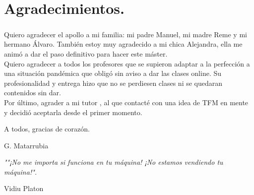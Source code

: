 \chapter{Agradecimientos.}\label{sec:agradecimientos}

\paragraph{}Quiero agradecer el apollo a mi familia: mi padre Manuel, mi madre Reme y mi hermano Álvaro.
También estoy muy agradecido a mi chica Alejandra, ella me animó a dar el paso definitivo para hacer este
máster. \\
Quiero agradecer a todos los profesores que se supieron adaptar a la perfección a una situación
pandémica que obligó sin aviso a dar las clases online. Su profesionalidad y entrega hizo que no
se perdiesen clases ni se quedaran contenidos sin dar. \\
Por último, agrader a mi tutor \TUTOR, al que contacté con una idea de TFM en mente y decidió
aceptarla desde el primer momento.

A todos, gracias de corazón.


\begin{flushright}
G. Matarrubia
\end{flushright}

%
\vspace*{\fill}

\emph{""¡No me importa si funciona en tu máquina! ¡No estamos vendiendo tu máquina!".}

\begin{flushright}
	Vidiu Platon
\end{flushright}

\vspace*{\fill}
%

\cleardoublepage